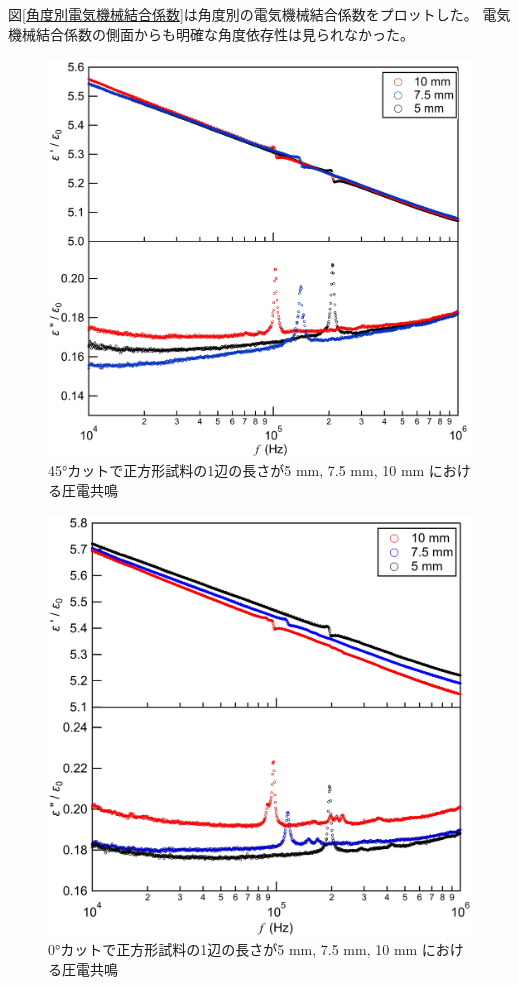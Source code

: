 \documentclass[dvipdfmx,12pt,a4paper]{jreport}
\begin{document}
			図\ref{角度別電気機械結合係数}は角度別の電気機械結合係数をプロットした。
			電気機械結合係数の側面からも明確な角度依存性は見られなかった。
			\begin{figure}[h]
				\centering
				\includegraphics[scale=1]{45deg_he_hi_ru.jpg}
				\caption{45°カットで正方形試料の1辺の長さが5 mm, 7.5 mm, 10 mm における圧電共鳴}
				\label{45deg_cut_piezo_resonant}
			\end{figure}
			\begin{figure}[H]
				\centering
				\includegraphics[scale=1]{0deg_without_sericin_2.jpg}
				\caption{0°カットで正方形試料の1辺の長さが5 mm, 7.5 mm, 10 mm における圧電共鳴}
				\label{0deg_cut_piezo_resonant}
			\end{figure}
\end{document}
